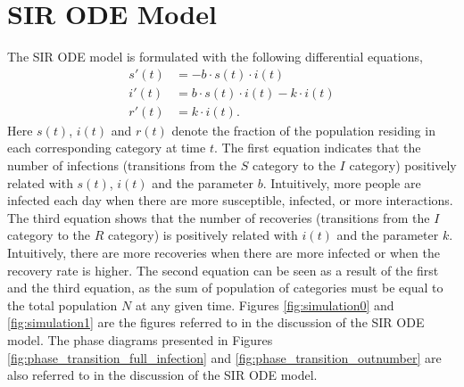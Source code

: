 \documentclass[12pt, reqno]{amsart}
\begin{document}
    \newpage

    \appendix 
    \section{SIR ODE Model}\label{appendix:sir_ode_figs}
    The SIR ODE model is formulated with the following differential equations,
    \begin{align*}
        s'(t) &= -b\cdot s(t) \cdot i(t) \\
        i'(t) &= b \cdot s(t) \cdot i(t) - k\cdot i(t) \\
        r'(t) &= k \cdot i(t).
    \end{align*}
    Here \(s(t)\), \(i(t)\) and \(r(t)\) denote the fraction of the population residing in each corresponding category at time \(t\). The first equation indicates that the number of infections (transitions from the \(S\) category to the \(I\) category) positively related with \(s(t)\), \(i(t)\) and the parameter \(b\). Intuitively, more people are infected each day when there are more susceptible, infected, or more interactions. The third equation shows that the number of recoveries (transitions from the \(I\) category to the \(R\) category) is positively related with \(i(t)\) and the parameter \(k\). Intuitively, there are more recoveries when there are more infected or when the recovery rate is higher. The second equation can be seen as a result of the first and the third equation, as the sum of population of categories must be equal to the total population \(N\) at any given time. Figures \ref{fig:simulation0} and \ref{fig:simulation1} are the figures referred to in the discussion of the SIR ODE model. The phase diagrams presented in Figures \ref{fig:phase_transition_full_infection} and \ref{fig:phase_transition_outnumber} are also referred to in the discussion of the SIR ODE model. 
    
\end{document}
